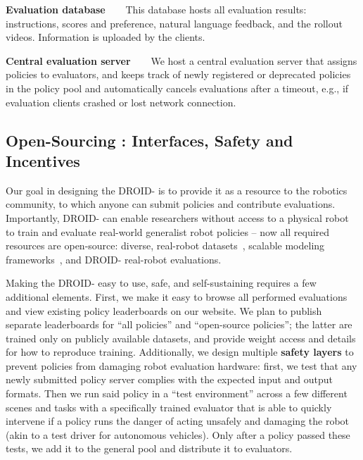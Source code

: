 \textbf{Evaluation database~~~} This database hosts all evaluation results: instructions, scores and preference, natural language feedback, and the rollout videos. Information is uploaded by the clients.

\textbf{Central evaluation server~~~} We host a central evaluation server that assigns policies to evaluators, and keeps track of newly registered or deprecated policies in the policy pool and automatically cancels evaluations after a timeout, e.g., if evaluation clients crashed or lost network connection. %


\subsection{Open-Sourcing \Acronym{}: Interfaces, Safety and Incentives}
\label{sec:open_sourcing}

Our goal in designing the DROID-\Acronym{} is to provide it as a resource to the robotics community, to which anyone can submit policies and contribute evaluations. Importantly, DROID-\Acronym{} can enable researchers without access to a physical robot to train and evaluate real-world generalist robot policies -- now all required resources are open-source: diverse, real-robot datasets~\citep{walke2023bridgedata, open_x_embodiment_rt_x_2023, khazatsky2024droid, contributors2025agibotworld}, scalable modeling frameworks~\citep{octo_2023, kim2024openvla, ren2023openpizero, pi2025openpi, bjorck2025gr00t}, and DROID-\Acronym{} real-robot evaluations. 


Making the DROID-\Acronym{} easy to use, safe, and self-sustaining requires a few additional elements. First, we make it easy to browse all performed evaluations and view existing policy leaderboards on our website. We plan to publish separate leaderboards for ``all policies'' and ``open-source policies''; the latter are trained only on publicly available datasets, and provide weight access and details for how to reproduce training. Additionally, we design multiple \textbf{safety layers} to prevent policies from damaging robot evaluation hardware: first, we test that any newly submitted policy server complies with the expected input and output formats. Then we run said policy in a ``test environment'' across a few different scenes and tasks with a specifically trained evaluator that is able to quickly intervene if a policy runs the danger of acting unsafely and damaging the robot (akin to a test driver for autonomous vehicles). Only after a policy passed these tests, we add it to the general pool and distribute it to evaluators.

